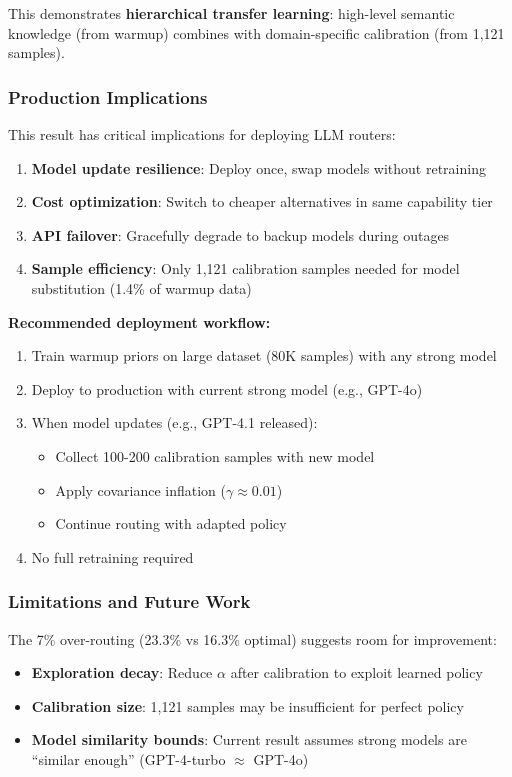 This demonstrates \textbf{hierarchical transfer learning}: high-level semantic knowledge (from warmup) combines with domain-specific calibration (from 1,121 samples).

\subsubsection{Production Implications}

This result has critical implications for deploying LLM routers:
\begin{enumerate}
    \item \textbf{Model update resilience}: Deploy once, swap models without retraining
    \item \textbf{Cost optimization}: Switch to cheaper alternatives in same capability tier
    \item \textbf{API failover}: Gracefully degrade to backup models during outages
    \item \textbf{Sample efficiency}: Only 1,121 calibration samples needed for model substitution (1.4\% of warmup data)
\end{enumerate}

\textbf{Recommended deployment workflow:}
\begin{enumerate}
    \item Train warmup priors on large dataset (80K samples) with any strong model
    \item Deploy to production with current strong model (e.g., GPT-4o)
    \item When model updates (e.g., GPT-4.1 released):
    \begin{itemize}
        \item Collect 100-200 calibration samples with new model
        \item Apply covariance inflation ($\gamma \approx 0.01$)
        \item Continue routing with adapted policy
    \end{itemize}
    \item No full retraining required
\end{enumerate}

\subsubsection{Limitations and Future Work}

The 7\% over-routing (23.3\% vs 16.3\% optimal) suggests room for improvement:
\begin{itemize}
    \item \textbf{Exploration decay}: Reduce $\alpha$ after calibration to exploit learned policy
    \item \textbf{Calibration size}: 1,121 samples may be insufficient for perfect policy
    \item \textbf{Model similarity bounds}: Current result assumes strong models are ``similar enough'' (GPT-4-turbo $\approx$ GPT-4o)
\end{itemize}

